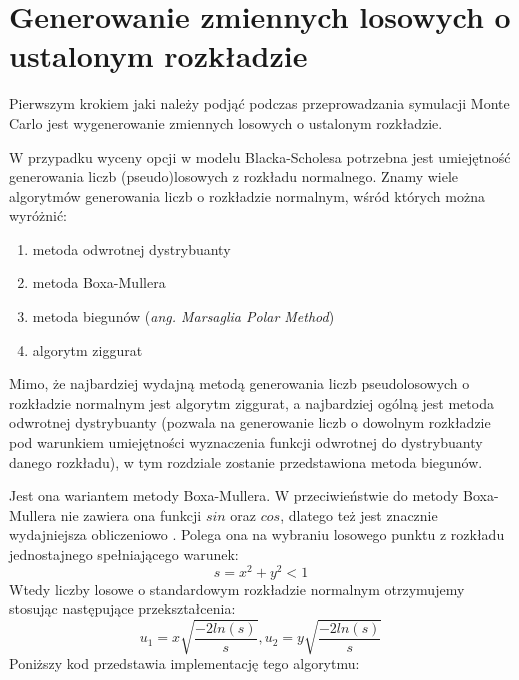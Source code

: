 \documentclass{pracamgr}
\begin{document}
\section{Generowanie zmiennych losowych o ustalonym rozkładzie}
\label{sec:genRV}

Pierwszym krokiem jaki należy podjąć podczas przeprowadzania symulacji Monte Carlo jest 
wygenerowanie zmiennych losowych o ustalonym rozkładzie.

W przypadku wyceny opcji w modelu Blacka-Scholesa potrzebna jest umiejętność generowania liczb 
(pseudo)losowych z rozkładu normalnego. Znamy wiele algorytmów generowania liczb o rozkładzie
normalnym, wśród których można wyróżnić:
\begin{enumerate}
  \item metoda odwrotnej dystrybuanty
  \item metoda Boxa-Mullera
  \item metoda biegunów (\textit{ang. Marsaglia Polar Method}) \cite{Marsaglia}
  \item algorytm ziggurat
\end{enumerate}

Mimo, że najbardziej wydajną metodą generowania liczb pseudolosowych o rozkładzie normalnym jest 
algorytm ziggurat, a najbardziej ogólną jest metoda odwrotnej dystrybuanty (pozwala na generowanie 
liczb o dowolnym rozkładzie pod warunkiem umiejętności wyznaczenia funkcji odwrotnej do dystrybuanty 
danego rozkładu), w tym rozdziale zostanie przedstawiona metoda biegunów.

Jest ona wariantem metody Boxa-Mullera. W przeciwieństwie do 
metody Boxa-Mullera nie zawiera ona funkcji $sin$ oraz $cos$, dlatego też jest znacznie wydajniejsza 
obliczeniowo \cite{Korn}.
Polega ona na wybraniu losowego punktu z rozkładu jednostajnego spełniającego warunek:
\begin{equation}
  s = x^2 + y^2 < 1
\end{equation}
Wtedy liczby losowe o standardowym rozkładzie normalnym otrzymujemy stosując następujące 
przekształcenia:
\begin{equation}
  u_1 = x \sqrt{\frac{-2ln(s)}{s}}, u_2 = y \sqrt{\frac{-2ln(s)}{s}}
\end{equation}
Poniższy kod przedstawia implementację tego algorytmu:

\end{document}
